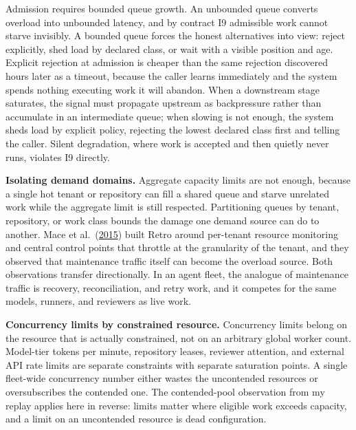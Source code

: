 Admission requires bounded queue growth. An unbounded queue converts overload into unbounded latency, and by contract I9 admissible work cannot starve invisibly. A bounded queue forces the honest alternatives into view: reject explicitly, shed load by declared class, or wait with a visible position and age. Explicit rejection at admission is cheaper than the same rejection discovered hours later as a timeout, because the caller learns immediately and the system spends nothing executing work it will abandon. When a downstream stage saturates, the signal must propagate upstream as backpressure rather than accumulate in an intermediate queue; when slowing is not enough, the system sheds load by explicit policy, rejecting the lowest declared class first and telling the caller. Silent degradation, where work is accepted and then quietly never runs, violates I9 directly.

\textbf{Isolating demand domains.} Aggregate capacity limits are not enough, because a single hot tenant or repository can fill a shared queue and starve unrelated work while the aggregate limit is still respected. Partitioning queues by tenant, repository, or work class bounds the damage one demand source can do to another. Mace et al.~(\href{https://www.usenix.org/conference/nsdi15/technical-sessions/presentation/mace}{2015}) built Retro around per-tenant resource monitoring and central control points that throttle at the granularity of the tenant, and they observed that maintenance traffic itself can become the overload source. Both observations transfer directionally. In an agent fleet, the analogue of maintenance traffic is recovery, reconciliation, and retry work, and it competes for the same models, runners, and reviewers as live work.

\textbf{Concurrency limits by constrained resource.} Concurrency limits belong on the resource that is actually constrained, not on an arbitrary global worker count. Model-tier tokens per minute, repository leases, reviewer attention, and external API rate limits are separate constraints with separate saturation points. A single fleet-wide concurrency number either wastes the uncontended resources or oversubscribes the contended one. The contended-pool observation from my replay applies here in reverse: limits matter where eligible work exceeds capacity, and a limit on an uncontended resource is dead configuration.

